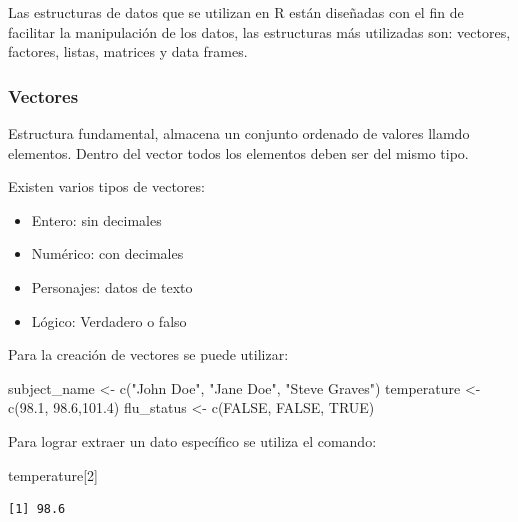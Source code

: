 \documentclass[
  letterpaper,
  DIV=11,
  numbers=noendperiod]{scrartcl}
\newenvironment{Shaded}{\begin{snugshade}}{\end{snugshade}}
\newcommand{\ConstantTok}[1]{\textcolor[rgb]{0.56,0.35,0.01}{#1}}
\newcommand{\DecValTok}[1]{\textcolor[rgb]{0.68,0.00,0.00}{#1}}
\newcommand{\FloatTok}[1]{\textcolor[rgb]{0.68,0.00,0.00}{#1}}
\newcommand{\FunctionTok}[1]{\textcolor[rgb]{0.28,0.35,0.67}{#1}}
\newcommand{\NormalTok}[1]{\textcolor[rgb]{0.00,0.23,0.31}{#1}}
\newcommand{\OtherTok}[1]{\textcolor[rgb]{0.00,0.23,0.31}{#1}}
\newcommand{\StringTok}[1]{\textcolor[rgb]{0.13,0.47,0.30}{#1}}
\begin{document}
Las estructuras de datos que se utilizan en R están diseñadas con el fin
de facilitar la manipulación de los datos, las estructuras más
utilizadas son: vectores, factores, listas, matrices y data frames.

\hypertarget{vectores}{%
\subsubsection{Vectores}\label{vectores}}

Estructura fundamental, almacena un conjunto ordenado de valores llamdo
elementos. Dentro del vector todos los elementos deben ser del mismo
tipo.

Existen varios tipos de vectores:

\begin{itemize}
\item
  Entero: sin decimales
\item
  Numérico: con decimales
\item
  Personajes: datos de texto
\item
  Lógico: Verdadero o falso
\end{itemize}

Para la creación de vectores se puede utilizar:

\begin{Shaded}
\begin{Highlighting}[]
\NormalTok{subject\_name }\OtherTok{\textless{}{-}} \FunctionTok{c}\NormalTok{(}\StringTok{"John Doe"}\NormalTok{, }\StringTok{"Jane Doe"}\NormalTok{, }\StringTok{"Steve Graves"}\NormalTok{)}
\NormalTok{temperature }\OtherTok{\textless{}{-}} \FunctionTok{c}\NormalTok{(}\FloatTok{98.1}\NormalTok{, }\FloatTok{98.6}\NormalTok{,}\FloatTok{101.4}\NormalTok{)}
\NormalTok{flu\_status }\OtherTok{\textless{}{-}} \FunctionTok{c}\NormalTok{(}\ConstantTok{FALSE}\NormalTok{, }\ConstantTok{FALSE}\NormalTok{, }\ConstantTok{TRUE}\NormalTok{)}
\end{Highlighting}
\end{Shaded}

Para lograr extraer un dato específico se utiliza el comando:

\begin{Shaded}
\begin{Highlighting}[]
\NormalTok{temperature[}\DecValTok{2}\NormalTok{]}
\end{Highlighting}
\end{Shaded}

\begin{verbatim}
[1] 98.6
\end{verbatim}
\end{document}
